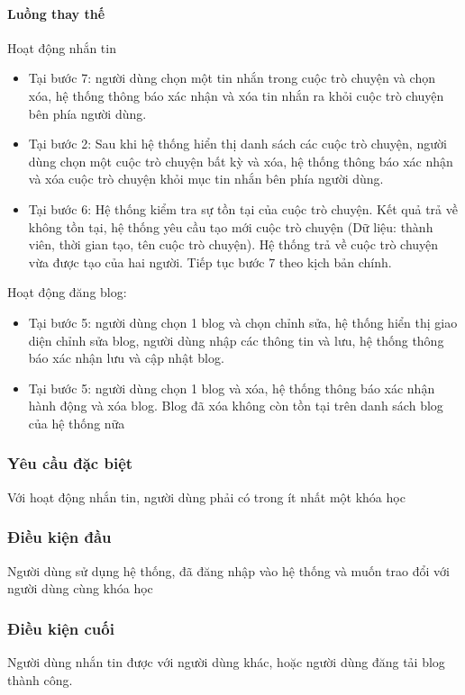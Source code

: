 \documentclass[./../main_file.tex]{subfiles}
\begin{document}
\paragraph{Luồng thay thế}
	Hoạt động nhắn tin
\begin{itemize}
	\item Tại bước 7: người dùng chọn một tin nhắn trong cuộc trò chuyện và chọn xóa, hệ thống thông báo xác nhận và xóa tin nhắn ra khỏi cuộc trò chuyện bên phía người dùng.
	\item Tại bước 2: Sau khi hệ thống hiển thị danh sách các cuộc trò chuyện, người dùng chọn một cuộc trò chuyện bất kỳ và xóa, hệ thống thông báo xác nhận và xóa cuộc trò chuyện khỏi mục tin nhắn bên phía người dùng.
	\item Tại bước 6: Hệ thống kiểm tra sự tồn tại của cuộc trò chuyện. Kết quả trả về không tồn tại, hệ thống yêu cầu tạo mới cuộc trò chuyện (Dữ liệu: thành viên, thời gian tạo, tên cuộc trò chuyện). Hệ thống trả về cuộc trò chuyện vừa được tạo của hai người. Tiếp tục bước 7 theo kịch bản chính. 
\end{itemize}
	Hoạt động đăng blog:
\begin{itemize}
	\item Tại bước 5: người dùng chọn 1 blog và chọn chỉnh sửa, hệ thống hiển thị giao diện chỉnh sửa blog, người dùng nhập các thông tin và lưu, hệ thống thông báo xác nhận lưu và cập nhật blog.
	\item Tại bước 5: người dùng chọn 1 blog và xóa, hệ thống thông báo xác nhận hành động và xóa blog. Blog đã xóa không còn tồn tại trên danh sách blog của hệ thống nữa
	
\end{itemize}
\subsubsection{Yêu cầu đặc biệt}
Với hoạt động nhắn tin, người dùng phải có trong ít nhất một khóa học

\subsubsection{Điều kiện đầu}
Người dùng sử dụng hệ thống, đã đăng nhập vào hệ thống và muốn trao đổi với người dùng cùng khóa học

\subsubsection{Điều kiện cuối}
Người dùng nhắn tin được với người dùng khác,  hoặc người dùng đăng tải blog thành công.
\end{document}
